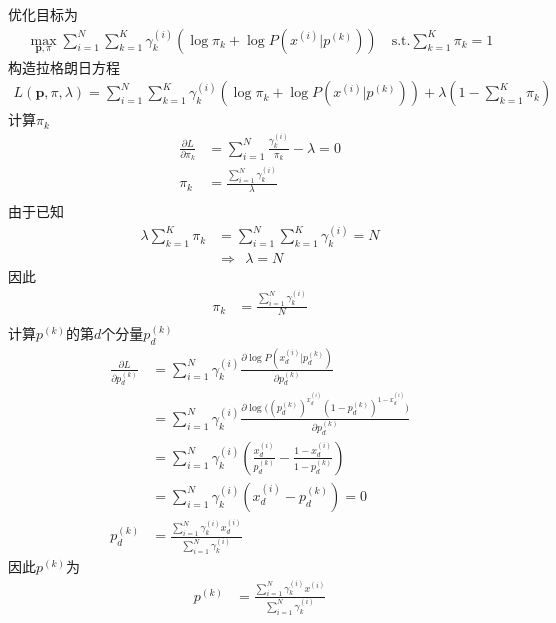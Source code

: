 \documentclass[12pt, a4paper]{article}
\begin{document}
优化目标为
\begin{align*}
    \mathop{max}\limits_{\mathbf{p},\pi}\sum_{i=1}^{N}\sum_{k=1}^K \gamma_k^{(i)}(\log\pi_k+\log P(x^{(i)}\vert p^{(k)}))
    \quad \text{s.t.} \sum_{k=1}^K\pi_k=1
\end{align*}
构造拉格朗日方程
\begin{align*}
    L(\mathbf{p},\pi,\lambda)=\sum_{i=1}^{N}\sum_{k=1}^K \gamma_k^{(i)}(\log\pi_k+\log P(x^{(i)}\vert p^{(k)}))
    +\lambda(1-\sum_{k=1}^K\pi_k)
\end{align*}
计算$\pi_k$
\begin{align*}
    \frac{\partial L}{\partial \pi_k}&=\sum_{i=1}^N\frac{\gamma_k^{(i)}}{\pi_k}-\lambda=0\\
    \pi_k&=\frac{\sum_{i=1}^{N}\gamma_k^{(i)}}{\lambda}\\
\end{align*}
由于已知
\begin{align*}
    \lambda \sum_{k=1}^K\pi_k&=\sum_{i=1}^N\sum_{k=1}^K\gamma_k^{(i)}=N\\
    &\Rightarrow \ \ \lambda=N
\end{align*}
因此
\begin{align*}
    \pi_k&=\frac{\sum_{i=1}^{N}\gamma_k^{(i)}}{N}\\
\end{align*}
计算$p^{(k)}$的第$d$个分量$p^{(k)}_d$
\begin{align*}
    \frac{\partial L}{\partial p^{(k)}_d}&=\sum_{i=1}^N \gamma_k^{(i)}\frac{\partial\log P(x^{(i)}_d\vert p^{(k)}_d)}{\partial p^{(k)}_d}\\
    &=\sum_{i=1}^N \gamma_k^{(i)}\frac{\partial\log\bigl((p^{(k)}_d)^{x^{(i)}_d}(1-p^{(k)}_d)^{1-x^{(i)}_d}\bigr)}{\partial p^{(k)}_d}\\
    &=\sum_{i=1}^N \gamma_k^{(i)}(\frac{x_d^{(i)}}{p^{(k)}_d}-\frac{1-x_d^{(i)}}{1-p_d^{(k)}})\\
    &=\sum_{i=1}^N \gamma_k^{(i)}(x_d^{(i)}-p_d^{(k)})=0\\
    p_d^{(k)}&=\frac{\sum_{i=1}^N\gamma_k^{(i)}x_d^{(i)}}{\sum_{i=1}^N\gamma_k^{(i)}}
\end{align*}
因此$p^{(k)}$为
\begin{align*}
    p^{(k)}&=\frac{\sum_{i=1}^N\gamma_k^{(i)}x^{(i)}}{\sum_{i=1}^N\gamma_k^{(i)}}
\end{align*}
\end{document}
